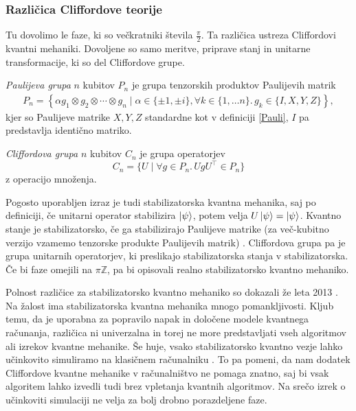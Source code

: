 \documentclass[mat1]{fmfdelo}
\newcommand{\Z}{\mathbb Z}
\newcommand{\tranp}{\top}
\newcommand{\sep}{\ensuremath{.\,}}
\begin{document}
\subsubsection{Različica Cliffordove teorije}
Tu dovolimo le faze, ki so večkratniki števila \(\frac\pi2\). Ta različica ustreza Cliffordovi kvantni mehaniki. Dovoljene so samo meritve, priprave stanj in unitarne transformacije, ki so del Cliffordove grupe.
\begin{definicija}
    \emph{Paulijeva grupa} \(n\) kubitov \(P_n\) je grupa tenzorskih produktov Paulijevih matrik
    \begin{align*}
        P_n = \left\{\alpha g_1\otimes g_2\otimes\cdots\otimes g_n \mid \alpha\in\{\pm 1, \pm i\}, \forall k\in\{1,\ldots n\}\sep g_k\in \{I,X,Y,Z\}\right\},
    \end{align*}
    kjer so Paulijeve matrike \(X,Y,Z\) standardne kot v definiciji \ref{Pauli}, \(I\) pa predstavlja identično matriko.
\end{definicija}
\begin{definicija}
    \emph{Cliffordova grupa} \(n\) kubitov \(C_n\) je grupa operatorjev \[C_n=\{U\mid \forall g\in P_n\sep UgU^\tranp\in P_n\}\] z operacijo množenja.
\end{definicija}
Pogosto uporabljen izraz je tudi stabilizatorska kvantna mehanika, saj po definiciji, če unitarni operator stabilizira \(\ket \psi\), potem velja \(U\ket\psi = \ket\psi\). Kvantno stanje je stabilizatorsko, če ga stabilizirajo Paulijeve matrike (za več-kubitno verzijo vzamemo tenzorske produkte Paulijevih matrik) \cite{Backens1}. Cliffordova grupa pa je grupa unitarnih operatorjev, ki preslikajo stabilizatorska stanja v stabilizatorska. Če bi faze omejili na \(\pi\Z\), pa bi opisovali realno stabilizatorsko kvantno mehaniko.

Polnost različice za stabilizatorsko kvantno mehaniko so dokazali že leta 2013 \cite{Backens1}. Na žalost ima stabilizatorska kvantna mehanika mnogo pomankljivosti. Kljub temu, da je uporabna za popravilo napak in določene modele kvantnega računanja, različica ni univerzalna in torej ne more predstavljati vseh algoritmov ali izrekov kvantne mehanike. Še huje, vsako stabilizatorsko kvantno vezje lahko učinkovito simuliramo na klasičnem računalniku \cite{Aaronson_2004}. To pa pomeni, da nam dodatek Cliffordove kvantne mehanike v računalništvo ne pomaga znatno, saj bi vsak algoritem lahko izvedli tudi brez vpletanja kvantnih algoritmov. Na srečo izrek o učinkoviti simulaciji ne velja za bolj drobno porazdeljene faze.
\end{document}
